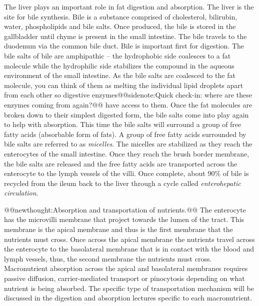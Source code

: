 \documentclass{tufte-handout}
\makeatletter
\def\newthought#1{@@newthought:#1@@}
\def\sidenote#1{@@sidenote:#1@@}
\makeatother
\begin{document}
The liver plays an important role in fat digestion and absorption. The liver is the site for bile synthesis. Bile is a substance comprised of  cholesterol, bilirubin, water, phospholipids and bile salts. Once produced, the bile is stored in the gallbladder until chyme is present in the small intestine. The bile travels to the duodenum via the common bile duct. Bile is important first for digestion. The bile salts of bile are amphipathic – the hydrophobic side coalesces to a fat molecule while the hydrophilic side stabilizes the compound in the aqueous environment of the small intestine. As the bile salts are coalesced to the fat molecule, you can think of them as melting the individual lipid droplets apart from each other so digestive enzymes\sidenote{Quick check-in: where are these enzymes coming from again?} have access to them. Once the fat molecules are broken down to their simplest digested form, the bile salts come into play again to help with absorption. This time the bile salts will surround a group of free fatty acids (absorbable form of fats). A group of free fatty acids surrounded by bile salts are referred to as \emph{micelles}. The micelles are stabilized as they reach the enterocytes of the small intestine. Once they reach the brush border membrane, the bile salts are released and the free fatty acids are transported across the enterocyte to the lymph vessels of the villi. Once complete, about 90\% of bile is recycled from the ileum back to the liver through a cycle called \emph{enterohepatic circulation}.

\newthought{Absorption and transportation of nutrients.} The enterocyte has the microvilli membrane that project towards the lumen of the tract. This membrane is the apical membrane and thus is the first membrane that the nutrients must cross. Once across the apical membrane the nutrients travel across the enterocyte to the basolateral membrane that is in contact with the blood and lymph vessels, thus, the second membrane the nutrients must cross. Macronutrient absorption across the apical and basolateral membranes requires passive diffusion, carrier-mediated transport or pinocytosis depending on what nutrient is being absorbed. The specific type of transportation mechanism will be discussed in the digestion and absorption lectures specific to each macronutrient.
\end{document}
